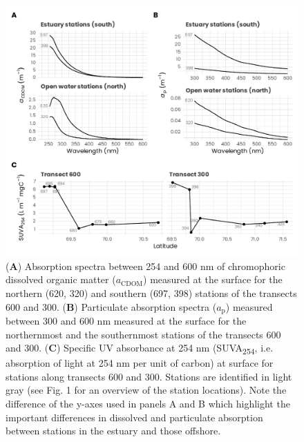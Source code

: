 \documentclass[essd, manuscript]{copernicus}
\begin{document}
\begin{figure}[H]
    \centering
    \includegraphics[scale = 1]{../../../graphs/fig06.pdf}
    \caption{(\textbf{A}) Absorption spectra between 254 and 600 nm of chromophoric dissolved organic matter ($a_{\text{CDOM}}$) measured at the surface for the northern (620, 320) and southern (697, 398) stations of the transects 600 and 300. (\textbf{B}) Particulate absorption spectra ($a_{\text{p}}$) measured between 300 and 600 nm measured at the surface for the northernmost and the southernmost stations of the transects 600 and 300. (\textbf{C}) Specific UV absorbance at 254 nm (SUVA\textsubscript{254}, i.e. absorption of light at 254 nm per unit of carbon) at surface for stations along transects 600 and 300. Stations are identified in light gray (see Fig. 1 for an overview of the station locations). Note the difference of the y-axes used in panels A and B which highlight the important differences in dissolved and particulate absorption between stations in the estuary and those offshore.}
\end{figure}

\clearpage
\end{document}
